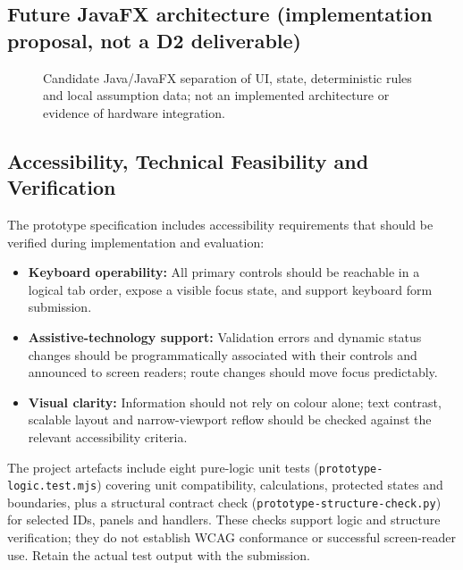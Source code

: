 \documentclass[12pt,a4paper]{article}
\newcommand{\code}[1]{\texttt{#1}}
\begin{document}
\subsection{Future JavaFX architecture (implementation proposal, not a D2 deliverable)}
\begin{figure}[ht]
\centering
{}
\caption{Candidate Java/JavaFX separation of UI, state, deterministic rules and local assumption data; not an implemented architecture or evidence of hardware integration.}
\label{fig:architecture-image}
\end{figure}

\subsection{Accessibility, Technical Feasibility and Verification}
The prototype specification includes accessibility requirements that should be verified during implementation and evaluation:
\begin{itemize}[leftmargin=*]
  \item \textbf{Keyboard operability:} All primary controls should be reachable in a logical tab order, expose a visible focus state, and support keyboard form submission.
  \item \textbf{Assistive-technology support:} Validation errors and dynamic status changes should be programmatically associated with their controls and announced to screen readers; route changes should move focus predictably.
  \item \textbf{Visual clarity:} Information should not rely on colour alone; text contrast, scalable layout and narrow-viewport reflow should be checked against the relevant accessibility criteria.
\end{itemize}
The project artefacts include eight pure-logic unit tests (\code{prototype-logic.test.mjs}) covering unit compatibility, calculations, protected states and boundaries, plus a structural contract check (\code{prototype-structure-check.py}) for selected IDs, panels and handlers. These checks support logic and structure verification; they do not establish WCAG conformance or successful screen-reader use. Retain the actual test output with the submission.
\end{document}
